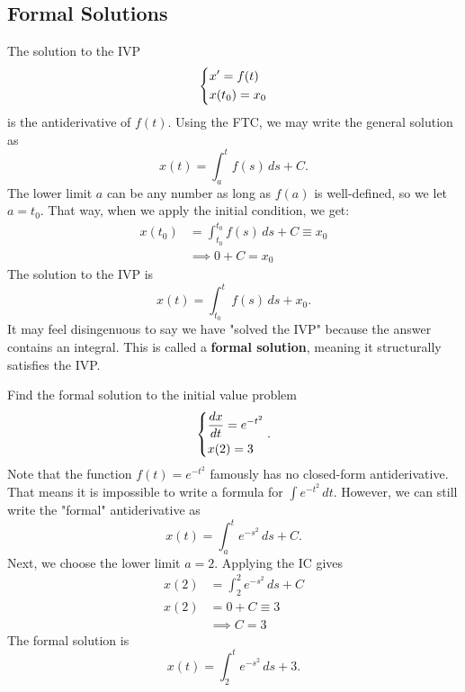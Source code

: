 \documentclass[11pt,letterpaper]{article}
\begin{document}
\subsection{Formal Solutions}

The solution to the IVP
\[
\begin{dcases}
    x' = f(t)\\
    x(t_0)=x_0
\end{dcases}
\]
is the antiderivative of $f(t)$. Using the FTC, we may write the general solution as
\[
x(t) = \int_a^t f(s)\,ds+C. 
\]
The lower limit $a$ can be any number as long as $f(a)$ is well-defined, so we let $a=t_0$. That way, when we apply the initial condition, we get:
\begin{align*}
    x(t_0)&=\int_{t_0}^{t_0} f(s)\,ds +C\equiv x_0\\
          &\implies0 +C = x_0
\end{align*}
The solution to the IVP is
\[
    x(t) =  \int_{t_0}^t f(s)\,ds+x_0. 
\]
It may feel disingenuous to say we have "solved the IVP" because the answer contains an integral. This is called a \textbf{formal solution}, meaning it structurally satisfies the IVP. 


\begin{example}[5]{
Find the formal solution to the initial value problem
\[
\begin{dcases}
    \frac{dx}{dt}= e^{-t^2}\\
    x(2) = 3
\end{dcases}.
\]
}
Note that the function $f(t) = e^{-t^2}$ famously has no closed-form antiderivative. That means it is impossible to write a formula for $\int e^{-t^2}\,dt$. However, we can still write the "formal" antiderivative as 
\[
    x(t) = \int_a^t e^{-s^2}\,ds +C.
\]
Next, we choose the lower limit $a=2$. Applying the IC gives 
\begin{align*}
    x(2) &= \int_2^2 e^{-s^2}\,ds +C\\
    x(2) &= 0 +C  \equiv 3\\
    &\implies C = 3
\end{align*}
The formal solution is 
\[
\boxed{
 x(t)= \int_2^t e^{-s^2}\,ds+3. 
}
\]
\end{example}

\end{document}
